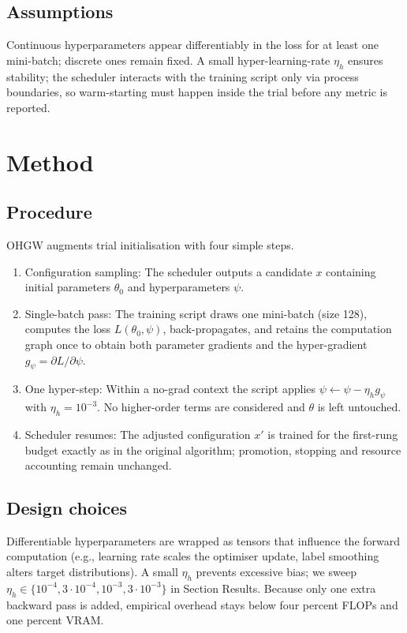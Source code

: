 \documentclass{article} %
\begin{document}
\subsection{Assumptions}
Continuous hyperparameters appear differentiably in the loss for at least one mini-batch; discrete ones remain fixed. A small hyper-learning-rate \(\eta_h\) ensures stability; the scheduler interacts with the training script only via process boundaries, so warm-starting must happen inside the trial before any metric is reported.

\section{Method}\label{sec:method}
\subsection{Procedure}
OHGW augments trial initialisation with four simple steps.
\begin{enumerate}
  \item Configuration sampling: The scheduler outputs a candidate \(x\) containing initial parameters \(\theta_0\) and hyperparameters \(\psi\).
  \item Single-batch pass: The training script draws one mini-batch (size 128), computes the loss \(L(\theta_0,\psi)\), back-propagates, and retains the computation graph once to obtain both parameter gradients and the hyper-gradient \(g_{\psi} = \partial L/\partial \psi\).
  \item One hyper-step: Within a no-grad context the script applies \(\psi \leftarrow \psi - \eta_h g_{\psi}\) with \(\eta_h = 10^{-3}\). No higher-order terms are considered and \(\theta\) is left untouched.
  \item Scheduler resumes: The adjusted configuration \(x'\) is trained for the first-rung budget exactly as in the original algorithm; promotion, stopping and resource accounting remain unchanged.
\end{enumerate}

\subsection{Design choices}
Differentiable hyperparameters are wrapped as tensors that influence the forward computation (e.g.\@, learning rate scales the optimiser update, label smoothing alters target distributions). A small \(\eta_h\) prevents excessive bias; we sweep \(\eta_h\in\{10^{-4}, 3\cdot10^{-4}, 10^{-3}, 3\cdot10^{-3}\}\) in Section Results. Because only one extra backward pass is added, empirical overhead stays below four percent FLOPs and one percent VRAM\@.
\end{document}
